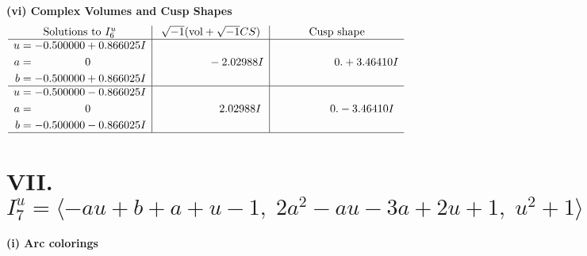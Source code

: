 \documentclass[1p]{elsarticle_modified}
\theoremstyle{definition}
\newcommand{\I}{\sqrt{-1}}
\begin{document}
\newpage\flushleft \textbf{(vi) Complex Volumes and Cusp Shapes}
$$\begin{array}{c|c|c}  
\text{Solutions to }I^u_{6}& \I (\text{vol} + \sqrt{-1}CS) & \text{Cusp shape}\\
 \hline 
\begin{aligned}
u &= -0.500000 + 0.866025 I \\
a &= \phantom{-0.000000 } 0 \\
b &= -0.500000 + 0.866025 I\end{aligned}
 & \phantom{-0.000000 } -2.02988 I & \phantom{-0.000000 -}0. + 3.46410 I \\ \hline\begin{aligned}
u &= -0.500000 - 0.866025 I \\
a &= \phantom{-0.000000 } 0 \\
b &= -0.500000 - 0.866025 I\end{aligned}
 & \phantom{-0.000000 -}2.02988 I & \phantom{-0.000000 } 0. - 3.46410 I\\
 \hline 
 \end{array}$$\newpage\newpage\renewcommand{\arraystretch}{1}
\centering \section*{VII. $I^u_{7}= \langle - a u+b+a+u-1,\;2 a^2- a u-3 a+2 u+1,\;u^2+1 \rangle$}
\flushleft \textbf{(i) Arc colorings}\\
\end{document}
